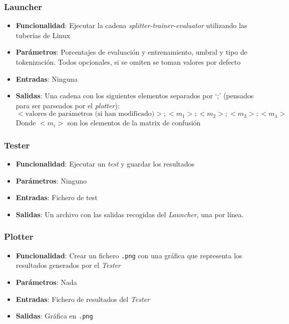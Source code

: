 \subsubsection{Launcher}

\begin{itemize}
	\item \textbf{Funcionalidad}: Ejecutar la cadena
		\textit{splitter-trainer-evaluator} utilizando las tuberías de
		Linux
	\item \textbf{Parámetros}: Porcentajes de evaluación y entrenamiento,
		umbral y tipo de tokenización. Todos opcionales, si se omiten se
		toman valores por defecto
	\item \textbf{Entradas}: Ninguna
	\item \textbf{Salidas}: Una cadena con los siguientes elementos
		separados por `;' (pensados para ser parseados por el
		\textit{plotter}):
		\begin{equation*}
			<\text{valores de parámetros (si han modificado)}>;<m_1>;<m_2>;<m_3>;<m_4>
		\end{equation*}
		Donde $<m_i>$ son los elementos de la matrix de confusión
\end{itemize}

\subsubsection{Tester}

\begin{itemize}
	\item \textbf{Funcionalidad}: Ejecutar un \textit{test} y guardar los
		resultados
	\item \textbf{Parámetros}: Ninguno
	\item \textbf{Entradas}: Fichero de test
	\item \textbf{Salidas}: Un archivo con las salidas recogidas del
		\textit{Launcher}, una por línea.
\end{itemize}

\subsubsection{Plotter}

\begin{itemize}
	\item \textbf{Funcionalidad}: Crear un fichero \texttt{.png} con una
		gráfica que representa los resultados generados por el
		\textit{Tester}
	\item \textbf{Parámetros}: Nada
	\item \textbf{Entradas}: Fichero de resultados del \textit{Tester}
	\item \textbf{Salidas}: Gráfica en \texttt{.png}
\end{itemize}
